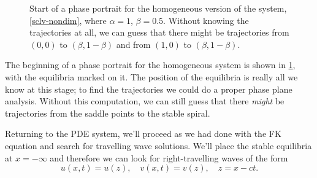\documentclass[main.tex]{subfiles}
\begin{document}
\begin{figure}
\centering

\caption{Start of a phase portrait for the homogeneous version of the system, \cref{sclv-nondim}, where $\alpha=1$, $\beta=0.5$. Without knowing the trajectories at all, we can guess that there might be trajectories from $(0,0)$ to $(\beta,1-\beta)$ and from $(1,0)$ to $(\beta,1-\beta)$.}
\label{fig:travelling-wave-predators-traj-0}
\end{figure}

The beginning of a phase portrait for the homogeneous system is shown in \cref{fig:travelling-wave-predators-traj-0}, with the equilibria marked on it. The position of the equilibria is really all we know at this stage; to find the trajectories we could do a proper phase plane analysis. Without this computation, we can still guess that there \emph{might} be trajectories from the saddle points to the stable spiral. 

Returning to the PDE system, we’ll proceed as we had done with the FK equation and search for travelling wave solutions. We'll place the stable equilibria at $x=-\infty$ and therefore we can look for right-travelling waves of the form
\begin{equation}
u(x,t) = u(z), \quad v(x,t) = v(z), \quad z = x-ct.
\end{equation}
\end{document}
